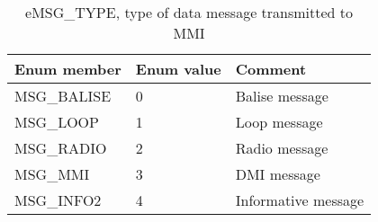 \documentclass{template/openetcs_article}
\begin{document}
\begin{longtable}{|l|l|l|}
	\caption{eMSG\_TYPE, type of data message transmitted to MMI}\\
	\hline
		\begin{minipage}[t]{0.60\linewidth} \textbf{Enum member}	\end{minipage}
	&	\begin{minipage}[t]{0.15\linewidth} \textbf{Enum value}	\end{minipage} 
	&	\begin{minipage}[t]{0.30\linewidth} \textbf{Comment} \end{minipage} \\
	\hline
		\begin{minipage}[t]{0.60\linewidth}	MSG\_BALISE\end{minipage}
	&	\begin{minipage}[t]{0.15\linewidth} 0 	\end{minipage}
	&	\begin{minipage}[t]{0.30\linewidth} Balise message\end{minipage} \\
	\hline
		\begin{minipage}[t]{0.60\linewidth}	MSG\_LOOP\end{minipage}
	&	\begin{minipage}[t]{0.15\linewidth} 1 	\end{minipage}
	&	\begin{minipage}[t]{0.30\linewidth} Loop message\end{minipage} \\
	\hline
		\begin{minipage}[t]{0.60\linewidth}	MSG\_RADIO\end{minipage}
	&	\begin{minipage}[t]{0.15\linewidth} 2 	\end{minipage}
	&	\begin{minipage}[t]{0.30\linewidth} Radio message\end{minipage} \\
	\hline
		\begin{minipage}[t]{0.60\linewidth}	MSG\_MMI\end{minipage}
	&	\begin{minipage}[t]{0.15\linewidth} 3 	\end{minipage}
	&	\begin{minipage}[t]{0.30\linewidth} DMI message\end{minipage} \\
	\hline
		\begin{minipage}[t]{0.60\linewidth}	MSG\_INFO2\end{minipage}
	&	\begin{minipage}[t]{0.15\linewidth} 4 	\end{minipage}
	&	\begin{minipage}[t]{0.30\linewidth} Informative message\end{minipage} \\
	\hline
\end{longtable}
\end{document}
